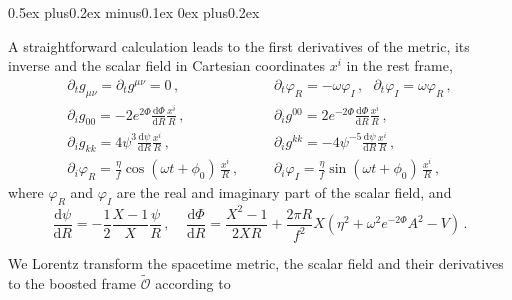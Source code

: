 \documentclass[11pt]{report}  %
\newcommand{\du}{\mathrm{d}}
\begin{document}
\begin{list}{\rm{\bf ()}}{
                
             \parsep0.5ex plus0.2ex minus0.1ex \itemsep0ex plus0.2ex}
  \item A straightforward calculation leads to the first derivatives of the
  metric, its inverse and the scalar field in Cartesian coordinates $x^i$ in the rest frame,
  \begin{eqnarray}
    \partial_t g_{\mu\nu}=\partial_t g^{\mu\nu}=0\,,~~~&&
    \partial_t \varphi_R = -\omega \varphi_I\,,~~~
    \partial_t \varphi_I = \omega \varphi_R\,,
    \nonumber \\[5pt]
    \partial_i g_{00} = -2e^{2\Phi}\frac{\du \Phi}{\du R} \frac{x^i}{R}\,,
    ~~~~~&&
    \partial_i g^{00} = 2e^{-2\Phi} \frac{\du \Phi}{\du R}\frac{x^i}{R}\,,
    \nonumber \\[5pt]
    \partial_i g_{kk} = 4\psi^3 \frac{\du \psi}{\du R} \frac{x^i}{R}\,,
    && \partial_i g^{kk} = -4\psi^{-5} \frac{\du \psi}{\du R}
          \frac{x^i}{R}\,,
    \nonumber \\[5pt]
    \partial_i \varphi_R = \frac{\eta}{f} \cos(\omega t + \phi_0)\,
        \frac{x^i}{R}\,,~~~~&&
  \partial_i \varphi_I = \frac{\eta}{f} \sin(\omega t + \phi_0)\,
        \frac{x^i}{R}\,,
  \end{eqnarray}
  where $\varphi_R$ and $\varphi_I$ are the real and imaginary part of the
  scalar field, and
  \begin{equation}
    \frac{\du \psi}{\du R} = -\frac{1}{2}
        \frac{X-1}{X} \frac{\psi}{R}\,,~~~~~
        \displaystyle \frac{\du \Phi}{\du R}=
        \frac{X^2-1}{2XR}+\frac{2\pi R}{f^2}X(\eta^2+\omega^2
        e^{-2\Phi}A^2-V)\,.
  \end{equation}
  \item We Lorentz transform the spacetime metric, the scalar field and their
  derivatives to the boosted frame $\tilde{\mathcal{O}}$ according to

\end{list}
\end{document}
